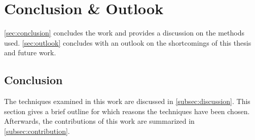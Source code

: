 \chapter{Conclusion \& Outlook}\label{ch:conclusion-outlook}

\autoref{sec:conclusion} concludes the work and provides a discussion on the methods used.
\autoref{sec:outlook} concludes with an outlook on the shortcomings of this thesis and future work.

\section{Conclusion}\label{sec:conclusion}

The techniques examined in this work are discussed in \autoref{subsec:discussion}.
This section gives a brief outline for which reasons the techniques have been chosen.
Afterwards, the contributions of this work are summarized in \autoref{subsec:contribution}.







